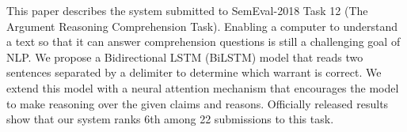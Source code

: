 This paper describes the system submitted to SemEval-2018 Task 12 (The Argument Reasoning Comprehension Task). Enabling a computer to understand a text so that it can answer comprehension questions is still a challenging goal of NLP. We propose a Bidirectional LSTM (BiLSTM) model that reads two sentences separated by a delimiter to determine which warrant is correct. We extend this model with a neural attention mechanism that encourages the model to make reasoning over the given claims and reasons. Officially released results show that our system ranks 6th among 22 submissions to this task.
